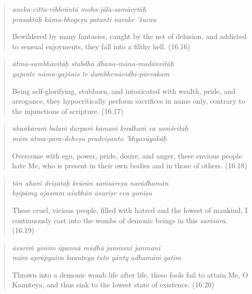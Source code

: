 \documentclass[12pt, twoside, openright]{memoir}
\begin{document}
\par
\begin{verse}
\textit{aneka-citta-vibhrāntā moha-jāla-samāvṛtāḥ} \\
\textit{prasaktāḥ kāma-bhogeṣu patanti narake ’śucau}

\noindent Bewildered by many fantasies, caught by the net of delusion, and addicted to sensual enjoyments, they fall into a filthy hell. (16.16)
\end{verse}
\par



\par
\begin{verse}
\textit{ātma-sambhāvitāḥ stabdhā dhana-māna-madānvitāḥ} \\
\textit{yajante nāma-yajñais te dambhenāvidhi-pūrvakam}

\noindent Being self-glorifying, stubborn, and intoxicated with wealth, pride, and arrogance, they hypocritically perform sacrifices in name only, contrary to the injunctions of scripture. (16.17)
\end{verse}
\par



\par
\begin{verse}
\textit{ahaṅkāraṁ balaṁ darpaṁ kāmaṁ krodhaṁ ca saṁśritāḥ} \\
\textit{mām ātma-para-deheṣu pradviṣanto ’bhyasūyakāḥ}

\noindent Overcome with ego, power, pride, desire, and anger, these envious people hate Me, who is present in their own bodies and in those of others. (16.18)
\end{verse}
\par



\par
\begin{verse}
\textit{tān ahaṁ dviṣataḥ krūrān saṁsāreṣu narādhamān} \\
\textit{kṣipāmy ajasram aśubhān āsurīṣv eva yoniṣu}

\noindent These cruel, vicious people, filled with hatred and the lowest of mankind, I continuously cast into the wombs of demonic beings in this \textit{saṁsāra}. (16.19)
\end{verse}
\par



\par
\begin{verse}
\textit{āsurīṁ yonim āpannā mūḍhā janmani janmani} \\
\textit{mām aprāpyaiva kaunteya tato yānty adhamāṁ gatim}

\noindent Thrown into a demonic womb life after life, these fools fail to attain Me, O Kaunteya, and thus sink to the lowest state of existence. (16.20)
\end{verse}
\par
\end{document}
